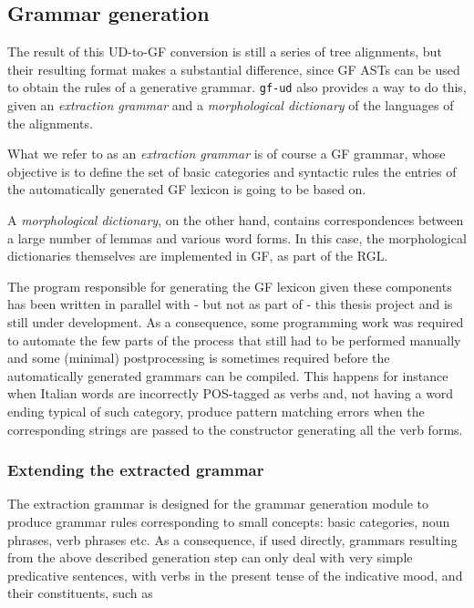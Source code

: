 \subsection{Grammar generation} \label{grgn}
The result of this UD-to-GF conversion is still a series of tree alignments, but their resulting format makes a substantial difference, since GF ASTs can be used to obtain the rules of a generative grammar. 
\texttt{gf-ud} also provides a way to do this, given an \textit{extraction grammar} and a \textit{morphological dictionary} of the languages of the alignments. \smallskip

What we refer to as an \textit{extraction grammar} is of course a GF grammar, whose objective is to define the set of basic categories and syntactic rules the entries of the automatically generated GF lexicon is going to be based on. \smallskip

A \textit{morphological dictionary}, on the other hand, contains correspondences between a large number of lemmas and various word forms. 
In this case, the morphological dictionaries themselves are implemented in GF, as part of the RGL. \smallskip

The program responsible for generating the GF lexicon given these components has been written in parallel with - but not as part of - this thesis project and is still under development. 
As a consequence, some programming work was required to automate the few parts of the process that still had to be performed manually and some (minimal) postprocessing is sometimes required before the automatically generated grammars can be compiled. 
This happens for instance when Italian words are incorrectly POS-tagged as verbs and, not having a word ending typical of such category, produce pattern matching errors when the corresponding strings are passed to the constructor generating all the verb forms. \smallskip

\subsubsection{Extending the extracted grammar} \label{extend}
The extraction grammar is designed for the grammar generation module to produce grammar rules corresponding to small concepts: basic categories, noun phrases, verb phrases etc. 
As a consequence, if used directly, grammars resulting from the above described generation step can only deal with very simple predicative sentences, with verbs in the present tense of the indicative mood, and their constituents, such as\smallskip

